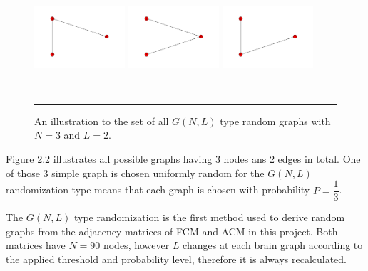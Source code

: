 \begin{figure}[htbp]
  \centering
	\includegraphics[width=0.30\textwidth, height=40mm]{Figures/f1.png}  
	\includegraphics[width=0.30\textwidth, height=40mm]{Figures/f2.png} 
    \includegraphics[width=0.30\textwidth, height=40mm]{Figures/f3.png}

    \rule{35em}{0.5pt}
  \caption[Erdos-Renyi Example]{An illustration to the set of all $G(N,L)$ type random graphs with $N=3$ and $L=2$.}
  \label{fig:Erdos-Renyi Example}
\end{figure}

Figure 2.2 illustrates all possible graphs having 3 nodes ans 2 edges in total. One of those 3 simple graph is chosen uniformly random for the $G(N,L)$ randomization type means that each graph is chosen with probability $P=\dfrac{1}{3}$.  

The $G(N,L)$ type randomization is the first method used to derive random graphs from the adjacency matrices of FCM and ACM in this project. Both matrices have $N=90$ nodes, however $L$ changes at each brain graph according to the applied threshold and probability level, therefore it is always recalculated. 


